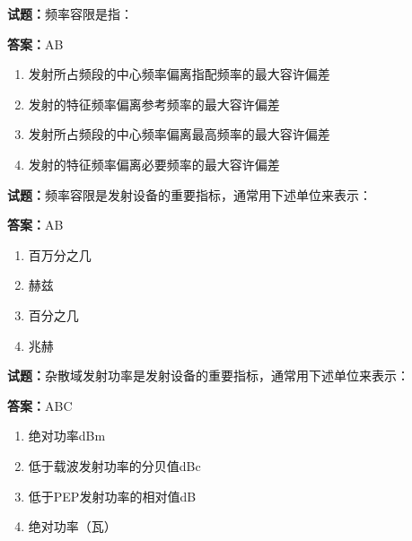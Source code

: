 \documentclass{ctexbook}
\begin{document}




\vspace{1em}

\textbf{试题：}频率容限是指： 

\textbf{答案：}AB 

\begin{enumerate}[leftmargin=3em]
  \item 发射所占频段的中心频率偏离指配频率的最大容许偏差 

  \item 发射的特征频率偏离参考频率的最大容许偏差 

  \item 发射所占频段的中心频率偏离最高频率的最大容许偏差 

  \item 发射的特征频率偏离必要频率的最大容许偏差 

\end{enumerate}





\vspace{1em}

\textbf{试题：}频率容限是发射设备的重要指标，通常用下述单位来表示： 

\textbf{答案：}AB 

\begin{enumerate}[leftmargin=3em]
  \item 百万分之几 

  \item 赫兹 

  \item 百分之几 

  \item 兆赫 

\end{enumerate}





\vspace{1em}

\textbf{试题：}杂散域发射功率是发射设备的重要指标，通常用下述单位来表示： 

\textbf{答案：}ABC 

\begin{enumerate}[leftmargin=3em]
  \item 绝对功率dBm 

  \item 低于载波发射功率的分贝值dBc 

  \item 低于PEP发射功率的相对值dB 

  \item 绝对功率（瓦） 

\end{enumerate}
\end{document}
